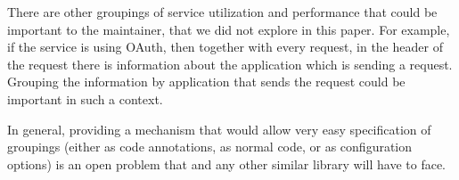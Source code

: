     There are other groupings of service utilization and performance that could be important to the maintainer, that we did not explore in this paper. For example, if the service is using OAuth, then together with every request, in the header of the request there is information about the application which is sending a request. Grouping the information by application that sends the request could be important in such a context. 

    In general, providing a mechanism that would allow very easy specification of groupings (either as code annotations, as normal code, or as configuration options) is an open problem that \tool and any other similar library will have to face.

